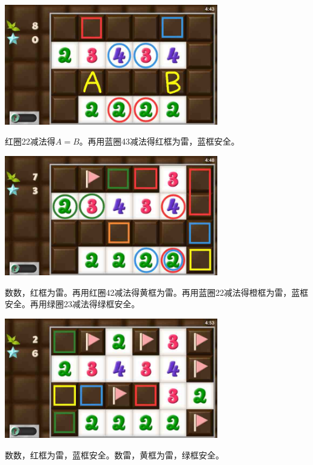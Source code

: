 \subsection{} %
\begin{center}
    \includegraphics[width=0.7\textwidth]{puzzlelow/54-1.jpg}
\end{center}
红圈22减法得$A=B$。再用蓝圈43减法得红框为雷，蓝框安全。
\begin{center}
    \includegraphics[width=0.7\textwidth]{puzzlelow/54-2.jpg}
\end{center}
数数，红框为雷。再用红圈42减法得黄框为雷。再用蓝圈22减法得橙框为雷，蓝框安全。再用绿圈23减法得绿框安全。
\begin{center}
    \includegraphics[width=0.7\textwidth]{puzzlelow/54-3.jpg}
\end{center}
数数，红框为雷，蓝框安全。数雷，黄框为雷，绿框安全。

